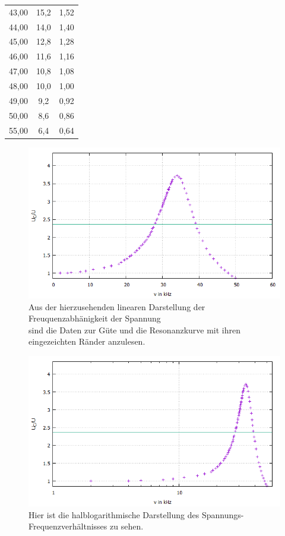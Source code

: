 \documentclass{scrartcl}
\begin{document}
\begin{table}
\begin{tabular}{S S S}
        43,00 & 15,2 & 1,52\\
        44,00 & 14,0 & 1,40\\
        45,00 & 12,8 & 1,28\\
        46,00 & 11,6 & 1,16\\
        47,00 & 10,8 & 1,08\\
        48,00 & 10,0 & 1,00\\
        49,00 & 9,2 & 0,92\\
        50,00 & 8,6 & 0,86\\
        55,00 & 6,4 & 0,64\\
     \bottomrule
     \end{tabular}
     \end{table}
     \begin{figure}
       \centering
       \includegraphics[width=\textwidth]{Linear1.jpeg}
     \caption{Aus der hierzusehenden linearen Darstellung der Freuquenzabhänigkeit der Spannung \\ sind die Daten zur Güte und die Resonanzkurve mit ihren eingezeichten Ränder anzulesen.}
     \label{fig:Linear1}
     \end{figure}
     \begin{figure}
       \centering
       \includegraphics[width=\textwidth]{Halblog1.jpeg}
       \caption{Hier ist die halblogarithmische Darstellung des Spannungs-Frequenzverhältnisses zu sehen.}
       \label{fig:Halb1}
     \end{figure}
\end{document}
